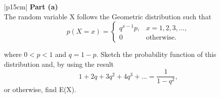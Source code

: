 \documentclass[a4paper,12pt]{article}
\begin{document}
 \begin{table}[ht!]
     \centering
     \begin{tabular}{|p{15cm}|}
     \hline        
 \noindent \textbf{Part (a)}\\
\noindent
The random variable X follows the Geometric distribution such that
\[{\displaystyle p(X = x) ={\begin{cases}q^{x-1}p,&x = 1,2,3, ...,\\0&\mbox{otherwise.}\end{cases}}} 
\]

where $0 < p <1$ and $q = 1 - p$.  Sketch the probability function of this distribution and, by using the result 
\[1+2q + 3q^2 + 4q^3 + ... =  \frac{1}{1-q^2} ,\] or otherwise, find E(X).

\\ \hline
 \end{tabular}
\end{table}
\end{document}
